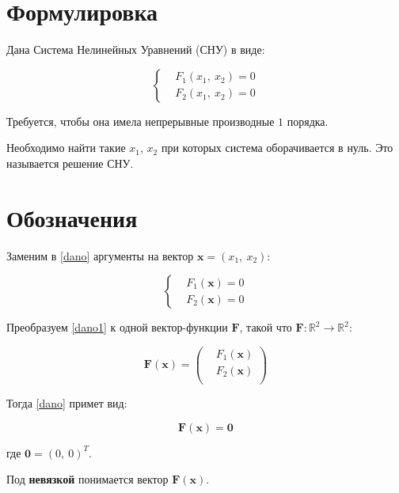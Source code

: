 \documentclass[12pt, a4paper]{article}
\newcommand{\roubr}[1]{\left(#1\right)}
\begin{document}
\setlength{\columnsep}{30pt}
\begin{multicols}{2}

\section{Формулировка}

Дана Система Нелинейных Уравнений (СНУ) в виде:

\begin{equation}\label{dano}
\left\{
\begin{aligned}
	&F_1(x_1,\ x_2) = 0 \\
	&F_2(x_1,\ x_2) = 0
\end{aligned}
\right.
\end{equation}

Требуется, чтобы она имела непрерывные производные $1$ порядка.

Необходимо найти такие $x_1$, $x_2$ при которых система оборачивается в нуль. Это называется решение СНУ.

\section{Обозначения}

Заменим в \eqref{dano} аргументы на вектор $\mathbf{x} = (x_1,\ x_2)$:

\begin{equation}\label{dano1}
\left\{
\begin{aligned}
	&F_1(\mathbf{x}) = 0 \\
	&F_2(\mathbf{x}) = 0
\end{aligned}
\right.
\end{equation}

Преобразуем \eqref{dano1} к одной вектор-функции $\mathbf{F}$, такой что $ \mathbf{F} : \mathbb{R}^2 \to \mathbb{R}^2 $:

$$\mathbf{F}(\mathbf{x}) = \roubr{
\begin{aligned}
	&F_1(\mathbf{x})\\
	&F_2(\mathbf{x})\\
\end{aligned}
}
$$

Тогда \eqref{dano} примет вид:

\begin{equation}\label{dano2}
\mathbf{F}(\mathbf{x}) = \mathbf{0}
\end{equation}

где $\mathbf{0}= (0,\ 0)^T$.

Под \textbf{невязкой} понимается вектор $\mathbf{F}(\mathbf{x})$.

\end{multicols}
\end{document}
